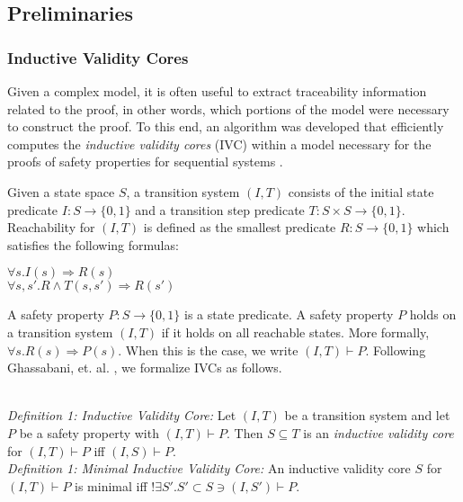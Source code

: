 \subsection{Preliminaries}

\subsubsection{Inductive Validity Cores}
Given a complex model, it is often useful to extract traceability information related to the proof, in other words, which portions of the model were necessary to construct the proof. To this end, an algorithm was developed that efficiently computes the \textit{inductive validity cores} (IVC) within a model necessary for the proofs of safety properties for sequential systems \cite{DBLP:journals/corr/GhassabaniGW16}. 

Given a state space $S$, a transition system $(I,T)$ consists of the initial state predicate $I : S \rightarrow \{0,1\}$ and a transition step predicate $T : S \times S \rightarrow \{0,1\}$. Reachability for $(I,T)$ is defined as the smallest predicate $R : S \rightarrow \{0,1\}$ which satisfies the following formulas:
\begin{center}
$\forall s. I(s) \Rightarrow R(s)$\\
$\forall s, s' .  R \land T(s,s') \Rightarrow R(s')$\\
\end{center}
A safety property $P : S \to \{0,1\}$ is a state predicate. A safety property $P$ holds on a transition system $(I,T)$ if it holds on all reachable states. More formally, $\forall s . R(s) \Rightarrow P(s)$. When this is the case, we write $(I,T) \vdash P$. Following Ghassabani, et. al. \cite{DBLP:journals/corr/GhassabaniGW16}, we formalize IVCs as follows.

\\
\textit{Definition 1: Inductive Validity Core:} Let $(I,T)$ be a transition system and let $P$ be a safety property with $(I,T) \vdash P$. Then $S \subseteq T$ is an \textit{inductive validity core} for $(I,T) \vdash P$ iff $(I,S) \vdash P$.  \\

\textit{Definition 1: Minimal Inductive Validity Core:} An inductive validity core $S$ for $(I,T) \vdash P$ is minimal iff $! \exists S' . S' \subset S \ni (I,S') \vdash P$. \\

